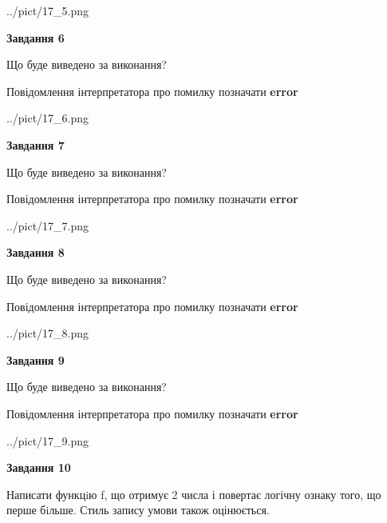 \documentclass[12pt, ukrainian]{article}
\begin{document}
{\begin {large}
\begin{center}
	{../pict/17_5.png}
\end{center}
\newpage

{\begin {center}\textbf{Завдання 6}\end {center}}\par
Що буде виведено за виконання? \par
Повідомлення інтерпретатора про помилку позначати \textbf{error}

\begin{center}
	{../pict/17_6.png}
\end{center}
\newpage

{\begin {center}\textbf{Завдання 7}\end {center}}\par
Що буде виведено за виконання? \par
Повідомлення інтерпретатора про помилку позначати \textbf{error}

\begin{center}
	{../pict/17_7.png}
\end{center}
\newpage

{\begin {center}\textbf{Завдання 8}\end {center}}\par
Що буде виведено за виконання? \par
Повідомлення інтерпретатора про помилку позначати \textbf{error}

\begin{center}
	{../pict/17_8.png}
\end{center}
\newpage

{\begin {center}\textbf{Завдання 9}\end {center}}\par
Що буде виведено за виконання? \par
Повідомлення інтерпретатора про помилку позначати \textbf{error}

\begin{center}
	{../pict/17_9.png}
\end{center}
\newpage

{\begin {center}\textbf{Завдання 10}\end {center}}\par

Написати функцiю f, що отримує 2 числа і повертає логічну ознаку того, що перше бiльше. Стиль запису умови також оцінюється.\par
\newpage

\end {large}}
\end{document}
